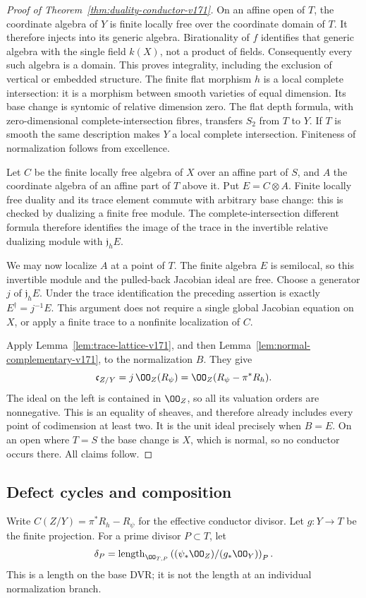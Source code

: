 \begin{proof}[Proof of Theorem~\ref{thm:duality-conductor-v171}]
On an affine open of $T$, the coordinate algebra of $Y$ is finite
locally free over the coordinate domain of $T$. It therefore injects
into its generic algebra. Birationality of $f$ identifies that generic
algebra with the single field $k(X)$, not a product of fields.
Consequently every such algebra is a domain. This proves integrality,
including the exclusion of vertical or embedded structure. The finite
flat morphism $h$ is a local complete intersection: it is a morphism
between smooth varieties of equal dimension. Its base change is
syntomic of relative dimension zero. The flat depth formula, with
zero-dimensional complete-intersection fibres, transfers $S_2$ from
$T$ to $Y$. If $T$ is smooth the same description makes $Y$ a local
complete intersection. Finiteness of normalization follows from
excellence.

Let $C$ be the finite locally free algebra of $X$ over an affine part
of $S$, and $A$ the coordinate algebra of an affine part of $T$ above
it. Put $E=C\otimes A$. Finite locally free duality and its trace
element commute with arbitrary base change: this is checked by
dualizing a finite free module. The complete-intersection different
formula therefore identifies the image of the trace in the invertible
relative dualizing module with $\mathfrak j_hE$.

We may now localize $A$ at a point of $T$. The finite algebra $E$ is
semilocal, so this invertible module and the pulled-back Jacobian
ideal are free. Choose a generator $j$ of $\mathfrak j_hE$.
Under the trace identification the preceding assertion is exactly
$E^\dagger=j^{-1}E$. This argument does not require a single global
Jacobian equation on $X$, or apply a finite trace to a nonfinite
localization of $C$.

Apply Lemma~\ref{lem:trace-lattice-v171}, and then
Lemma~\ref{lem:normal-complementary-v171}, to the normalization $B$.
They give
\[
 \mathfrak c_{Z/Y}=j\,\OO_Z(R_\psi)
                 =\OO_Z(R_\psi-\pi^*R_h).
\]
The ideal on the left is contained in $\OO_Z$, so all its valuation
orders are nonnegative. This is an equality of sheaves, and therefore
already includes every point of codimension at least two.
It is the unit ideal precisely when $B=E$. On an open where $T=S$
the base change is $X$, which is normal, so no conductor occurs there.
All claims follow.
\end{proof}

\subsection{Defect cycles and composition}
Write $C(Z/Y)=\pi^*R_h-R_\psi$ for the effective conductor divisor.
Let $g:Y\to T$ be the finite projection. For a prime divisor
$P\subset T$, let
\[
 \delta_P=\operatorname{length}_{\OO_{T,P}}
   \left((\psi_*\OO_Z)/(g_*\OO_Y)\right)_P.
\]
This is a length on the base DVR; it is not the length at an individual
normalization branch.

